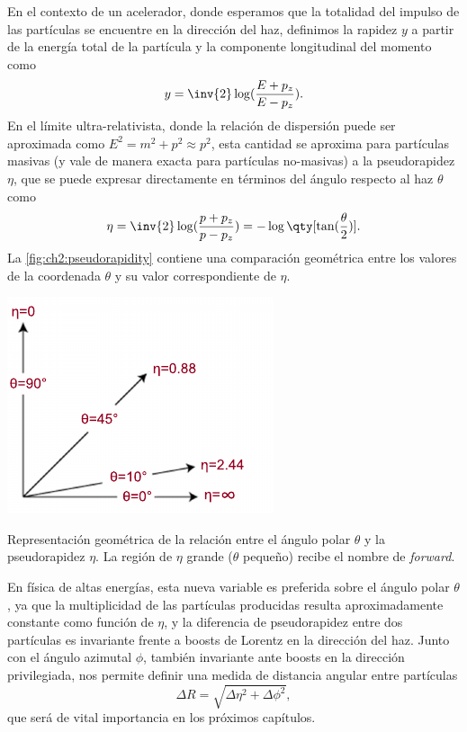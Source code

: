 En el contexto de un acelerador, donde esperamos que la totalidad del impulso de las partículas se encuentre en la dirección del haz, definimos la rapidez $y$ a partir de la energía total de la partícula y la componente longitudinal del momento como
\[ y = \inv{2} \log(\frac{E + p_z}{E - p_z}). \]
En el límite ultra-relativista, donde la relación de dispersión puede ser aproximada como $E^2 = m^2 + p^2 \approx p^2$, esta cantidad se aproxima para partículas masivas (y vale de manera exacta para partículas no-masivas) a la pseudorapidez $\eta$, que se puede expresar directamente en términos del ángulo respecto al haz $\theta$ como
\[ \eta = \inv{2} \log(\frac{p + p_z}{p - p_z}) = -\log\qty[ \tan(\frac{\theta}{2})]. \]
La \cref{fig:ch2:pseudorapidity} contiene una comparación geométrica entre los valores de la coordenada $\theta$ y su valor correspondiente de $\eta$.
\begin{marginfigure}
    \includegraphics[width=\linewidth]{Assets/Images/Pseudorapidity.pdf}
    \caption{Representación geométrica de la relación entre el ángulo polar $\theta$ y la pseudorapidez $\eta$. La región de $\eta$ grande ($\theta$ pequeño) recibe el nombre de \textit{forward}.}
    \label{fig:ch2:pseudorapidity}
\end{marginfigure}
En física de altas energías, esta nueva variable es preferida sobre el ángulo polar $\theta$, ya que la multiplicidad de las partículas producidas resulta aproximadamente constante como función de $\eta$, y la diferencia de pseudorapidez entre dos partículas es invariante frente a boosts de Lorentz en la dirección del haz. Junto con el ángulo azimutal $\phi$, también invariante ante boosts en la dirección privilegiada, nos permite definir una medida de distancia angular entre partículas
\[ \Delta R = \sqrt{\Delta\eta^2 + \Delta\phi^2}, \]
que será de vital importancia en los próximos capítulos.

